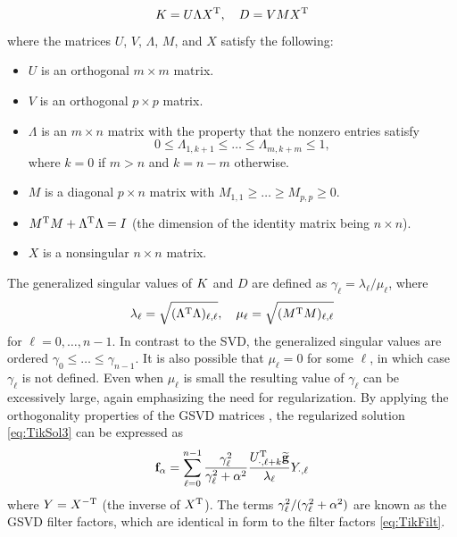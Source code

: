\begin{equation}
\label{eq:GSVD matrices}
K = U\Lambda X^{\mathrm{T}}, \quad D = VMX^{\mathrm{T}}
\end{equation}
where the matrices $U$, $V$, $\Lambda$, $M$, and $X$ satisfy the following: 
\begin{itemize}
\item $U$ is an orthogonal $m \times m$ matrix. 
\item $V$ is an orthogonal $p \times p$ matrix.
\item $\Lambda$ is an $m \times n$ matrix with the property that the nonzero entries satisfy
\[0 \leq \Lambda_{1,k+1} \leq \ldots \leq \Lambda_{m,k+m} \leq 1,\]
where $k = 0$ if $m > n$ and $k = n-m$ otherwise. 
\item $M$ is a diagonal $p \times n$ matrix with $M_{1,1} \geq \ldots \geq M_{p,p} \geq 0.$
\item $M^{\mathrm{T}} M + \Lambda^{\mathrm{T}} \Lambda = I$ (the dimension of the identity matrix being $n \times n$).
\item $X$ is a nonsingular $n \times n$ matrix.
\end{itemize}
The generalized singular values of $K$ and $D$ are defined as $\gamma_\ell = \lambda_{\ell}/\mu_{\ell}$, where
\begin{equation}
\label{eq:GSVD lambda}
\lambda_\ell = \sqrt{(\Lambda^{\mathrm{T}} \Lambda)_{\ell,\ell}}, \quad \mu_\ell = \sqrt{(M^{\mathrm{T}} M)_{\ell,\ell}}
\end{equation}
for $\ell = 0,\ldots,{n-1}$. In contrast to the SVD, the generalized singular values are ordered $\gamma_0 \leq \ldots \leq \gamma_{n-1}$. It is also possible that $\mu_\ell = 0$ for some $\ell$, in which case $\gamma_\ell$ is not defined. Even when $\mu_\ell$ is small the resulting value of $\gamma_\ell$ can be excessively large, again emphasizing the need for regularization. By applying the orthogonality properties of the GSVD matrices \cite[p.~105-106]{ABT}, the regularized solution \eqref{eq:TikSol3} can be expressed as
\begin{equation}
\label{eq:TikSol GSVD}
\mathbf{f}_\alpha = \sum_{\ell=0}^{n-1} \frac{\gamma_\ell^2}{\gamma_\ell^2 + \alpha^2} \frac{U_{\cdot,\ell+k}^{\mathrm{T}}\widetilde{\mathbf{g}}}{\lambda_\ell}Y_{\cdot,\ell}
\end{equation}
where $Y = X^{-\mathrm{T}}$ (the inverse of $X^{\mathrm{T}}$). The terms $\gamma_\ell^2/(\gamma_\ell^2 + \alpha^2)$ are known as the GSVD filter factors, which are identical in form to the filter factors \eqref{eq:TikFilt}. \par 

